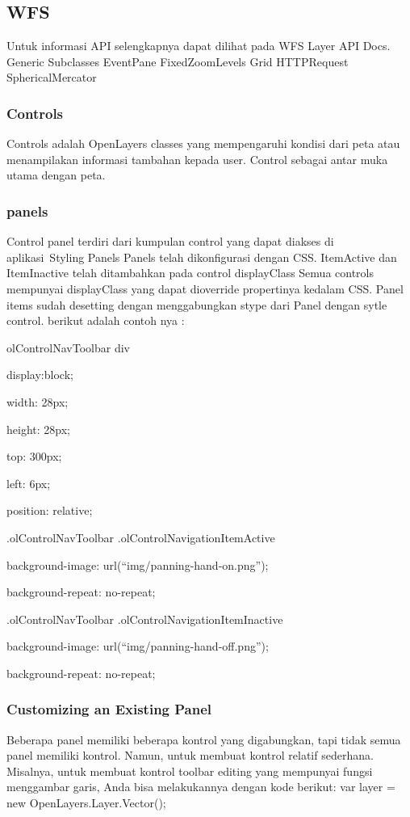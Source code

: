 \subsection {WFS}
Untuk informasi API selengkapnya dapat dilihat pada WFS Layer API Docs.
Generic Subclasses
EventPane
FixedZoomLevels
Grid
HTTPRequest
SphericalMercator

\subsubsection {Controls}
Controls adalah OpenLayers classes yang mempengaruhi kondisi dari peta atau menampilakan informasi tambahan kepada user. Control sebagai antar muka utama dengan peta.

\subsubsection {panels}
Control panel terdiri dari kumpulan control yang dapat diakses di aplikasi Styling Panels
Panels telah dikonfigurasi dengan CSS. ItemActive dan ItemInactive telah ditambahkan pada control displayClass
Semua controls mempunyai displayClass yang dapat dioverride propertinya kedalam CSS. Panel items sudah desetting dengan menggabungkan stype dari Panel dengan sytle control. berikut adalah contoh nya :

olControlNavToolbar div {

display:block;

width: 28px;

height: 28px;

top: 300px;

left: 6px;

position: relative;

}

.olControlNavToolbar .olControlNavigationItemActive {

background-image: url(“img/panning-hand-on.png”);

background-repeat: no-repeat;

}

.olControlNavToolbar .olControlNavigationItemInactive {

background-image: url(“img/panning-hand-off.png”);

background-repeat: no-repeat;

}

\subsubsection {Customizing an Existing Panel}
Beberapa panel  memiliki beberapa kontrol yang digabungkan, tapi tidak semua panel memiliki kontrol. Namun, untuk membuat kontrol relatif sederhana. Misalnya, untuk membuat kontrol toolbar editing yang mempunyai fungsi menggambar garis, Anda bisa melakukannya dengan kode berikut:
var layer = new OpenLayers.Layer.Vector();

